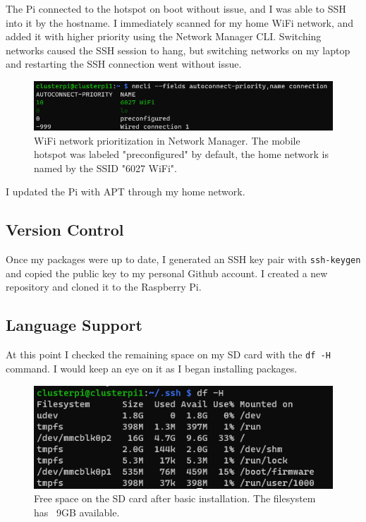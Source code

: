 \documentclass[12pt]{article}
\begin{document}
The Pi connected to the hotspot on boot without issue, and I was able to SSH into it by the hostname. I immediately scanned for my home WiFi network, and added it with higher priority using the Network Manager CLI. Switching networks caused the SSH session to hang, but switching networks on my laptop and restarting the SSH connection went without issue.

\begin{figure}[h]
\centering
\includegraphics[width=1.0\textwidth]{network-config.png} %
\caption{WiFi network prioritization in Network Manager. The mobile hotspot was labeled "preconfigured" by default, the home network is named by the SSID "6027 WiFi".}
\label{fig:networkpriority}
\end{figure}

I updated the Pi with APT through my home network. 

\subsection{Version Control}

Once my packages were up to date, I generated an SSH key pair with \verb|ssh-keygen| and copied the public key to my personal Github account. I created a new repository \cite{lybbert2024classwork} and cloned it to the Raspberry Pi. 

\subsection{Language Support}

At this point I checked the remaining space on my SD card with the \verb|df -H| command. I would keep an eye on it as I began installing packages.

\begin{figure}[h]
\centering
\includegraphics[width=1.0\textwidth]{freespace.png} %
\caption{Free space on the SD card after basic installation. The filesystem has ~9GB available.}
\label{fig:freespace}
\end{figure}
\end{document}
